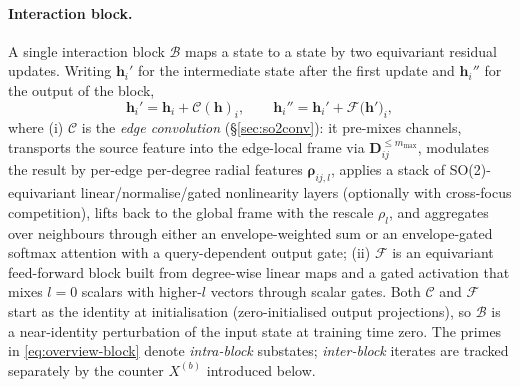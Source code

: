 \documentclass[11pt,a4paper]{article}
\newcommand{\bh}{\bm{h}}
\newcommand{\bD}{\bm{D}}
\newcommand{\brho}{\bm{\rho}}
\newcommand{\mmax}{m_{\max}}
\theoremstyle{plain}
\theoremstyle{definition}
\theoremstyle{remark}
\begin{document}
\paragraph{Interaction block.}
A single interaction block $\mathcal{B}$ maps a state to a state by two
equivariant residual updates. Writing $\bh_i'$ for the intermediate state after
the first update and $\bh_i''$ for the output of the block,
\begin{equation}\label{eq:overview-block}
    \bh_i' = \bh_i + \mathcal{C}(\bh)_i,\qquad
    \bh_i'' = \bh_i' + \mathcal{F}\bigl(\bh'\bigr)_i,
\end{equation}
where (i) $\mathcal{C}$ is the \emph{edge convolution} (\S\ref{sec:so2conv}): it pre-mixes channels, transports the source feature into the edge-local frame via $\bD_{ij}^{\le\mmax}$, modulates the result by per-edge per-degree radial features $\brho_{ij,l}$, applies a stack of SO(2)-equivariant linear/normalise/gated nonlinearity layers (optionally with cross-focus competition), lifts back to the global frame with the rescale $\rho_l$, and aggregates over neighbours through either an envelope-weighted sum or an envelope-gated softmax attention with a query-dependent output gate; (ii) $\mathcal{F}$ is an equivariant feed-forward block built from degree-wise linear maps and a gated activation that mixes $l=0$ scalars with higher-$l$ vectors through scalar gates.
Both $\mathcal{C}$ and $\mathcal{F}$ start as the identity at initialisation (zero-initialised output projections), so $\mathcal{B}$ is a near-identity perturbation of the input state at training time zero.
The primes in \eqref{eq:overview-block} denote \emph{intra-block} substates; \emph{inter-block} iterates are tracked separately by the counter $X^{(b)}$ introduced below.
\end{document}
